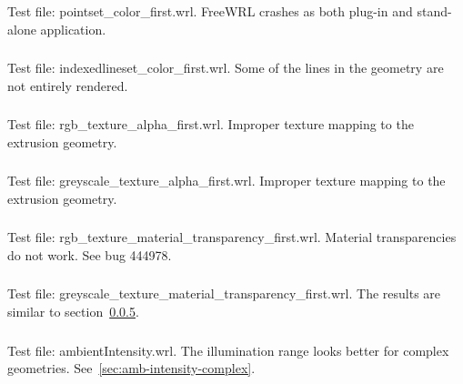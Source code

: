 \setcounter{subsubsection}{13}
\subsubsection{\MatNa\MatNb}
Test file: pointset\_color\_first.wrl.\newline
FreeWRL crashes as both plug-in and stand-alone application.

\setcounter{subsubsection}{15}
\subsubsection{\MatPa\MatPb}
Test file: indexedlineset\_color\_first.wrl.\newline
Some of the lines in the geometry are not entirely rendered.

\setcounter{subsubsection}{23}
\subsubsection{\MatRa\MatRb}
Test file: rgb\_texture\_alpha\_first.wrl.\newline
Improper texture mapping to the extrusion geometry.

\subsubsection{\MatSa\MatSb}
Test file: greyscale\_texture\_alpha\_first.wrl.\newline
Improper texture mapping to the extrusion geometry.

\subsubsection{\MatTa\MatTb}
\label{sec:rgb-texture-mat-transparency}
Test file: rgb\_texture\_material\_transparency\_first.wrl.\newline
Material transparencies do not work.
See bug 444978.

\subsubsection{\MatUa\MatUb}
Test file: greyscale\_texture\_material\_transparency\_first.wrl.\newline
The results are similar to section~\ref{sec:rgb-texture-mat-transparency}.

\subsubsection{\MatV}
Test file: ambientIntensity.wrl.\newline
The illumination range looks better for complex geometries.
See~\ref{sec:amb-intensity-complex}.

